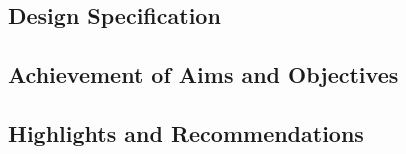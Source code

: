 \documentclass[../main.tex]{subfiles}
\begin{document}
\subsection{Design Specification}

\subsection{Achievement of Aims and Objectives}

\subsection{Highlights and Recommendations}
\end{document}
